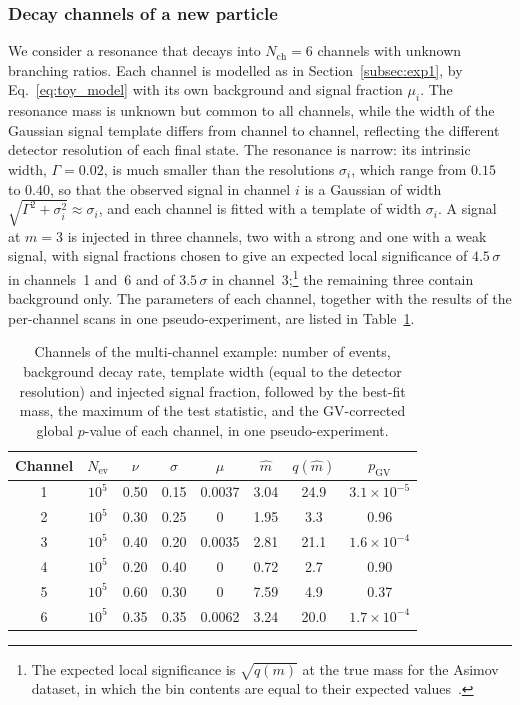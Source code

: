 \subsubsection{Decay channels of a new particle}\label{sec:exp_decay}
We consider a resonance that decays into $N_\text{ch}=6$ channels with unknown branching ratios. Each channel is modelled as in Section~\ref{subsec:exp1}, by Eq.~\eqref{eq:toy_model} with its own background and signal fraction $\mu_i$. The resonance mass is unknown but common to all channels, while the width of the Gaussian signal template differs from channel to channel, reflecting the different detector resolution of each final state. The resonance is narrow: its intrinsic width, $\Gamma=0.02$, is much smaller than the resolutions $\sigma_i$, which range from $0.15$ to $0.40$, so that the observed signal in channel $i$ is a Gaussian of width $\sqrt{\Gamma^2+\sigma_i^2}\approx\sigma_i$, and each channel is fitted with a template of width $\sigma_i$. A signal at $m=3$ is injected in three channels, two with a strong and one with a weak signal, with signal fractions chosen to give an expected local significance of $4.5\,\sigma$ in channels~1 and~6 and of $3.5\,\sigma$ in channel~3;\footnote{The expected local significance is $\sqrt{q(m)}$ at the true mass for the Asimov dataset, in which the bin contents are equal to their expected values~\cite{Cowan:2010js}.} the remaining three contain background only. The parameters of each channel, together with the results of the per-channel scans in one pseudo-experiment, are listed in Table~\ref{tab:channels}.
\begin{table}[htbp]
  \centering
  \caption{Channels of the multi-channel example: number of events, background decay rate, template width (equal to the detector resolution) and injected signal fraction, followed by the best-fit mass, the maximum of the test statistic, and the GV-corrected global $p$-value of each channel, in one pseudo-experiment.}
  \label{tab:channels}
  \begin{tabular}{ccccc|ccc}
    \toprule
    Channel & $N_\text{ev}$ & $\nu$ & $\sigma$ & $\mu$ & $\hat m$ & $q(\hat m)$ & $p_\text{GV}$ \\
    \midrule
    1 & $10^5$ & 0.50 & 0.15 & 0.0037 & 3.04 & 24.9 & $3.1\times10^{-5}$ \\
    2 & $10^5$ & 0.30 & 0.25 & 0 & 1.95 & 3.3 & 0.96 \\
    3 & $10^5$ & 0.40 & 0.20 & 0.0035 & 2.81 & 21.1 & $1.6\times10^{-4}$ \\
    4 & $10^5$ & 0.20 & 0.40 & 0 & 0.72 & 2.7 & 0.90 \\
    5 & $10^5$ & 0.60 & 0.30 & 0 & 7.59 & 4.9 & 0.37 \\
    6 & $10^5$ & 0.35 & 0.35 & 0.0062 & 3.24 & 20.0 & $1.7\times10^{-4}$ \\
    \bottomrule
  \end{tabular}
\end{table}
